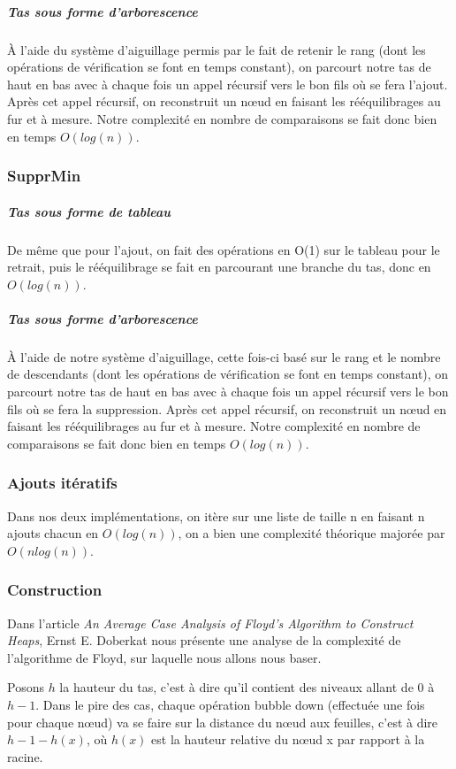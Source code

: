 \documentclass[12pt,a4paper]{article}
\begin{document}
\subparagraph{Tas sous forme d'arborescence}

À l'aide du système d'aiguillage permis par le fait de retenir le rang (dont les opérations de vérification se font en temps constant), on parcourt notre tas de haut en bas avec à chaque fois un appel récursif vers le bon fils où se fera l'ajout. Après cet appel récursif, on reconstruit un nœud en faisant les rééquilibrages au fur et à mesure. Notre complexité en nombre de comparaisons se fait donc bien en temps $O(log (n))$. 


\subsubsection{SupprMin}

\subparagraph{Tas sous forme de tableau}

De même que pour l'ajout, on fait des opérations en O(1) sur le tableau pour le retrait, puis le rééquilibrage se fait en parcourant une branche du tas, donc en $O(log (n))$.
\subparagraph{Tas sous forme d'arborescence}


À l'aide de notre système d'aiguillage, cette fois-ci basé sur le rang et le nombre de descendants (dont les opérations de vérification se font en temps constant), on parcourt notre tas de haut en bas avec à chaque fois un appel récursif vers le bon fils où se fera la suppression. Après cet appel récursif, on reconstruit un nœud en faisant les rééquilibrages au fur et à mesure. Notre complexité en nombre de comparaisons se fait donc bien en temps $O(log (n))$. 



\subsubsection{Ajouts itératifs}

Dans nos deux implémentations, on itère sur une liste de taille n en faisant n ajouts chacun en $O( log (n))$, on a bien une complexité théorique majorée par $O(n log(n))$.
\subsubsection{Construction}

Dans l'article \textit{An Average Case Analysis of Floyd's Algorithm to Construct Heaps}\cite{Doberkat}, Ernst E. Doberkat nous présente une analyse de la complexité de l'algorithme de Floyd, sur laquelle nous allons nous baser.

Posons $h$ la hauteur du tas, c'est à dire qu'il contient des niveaux allant de $0$ à $h - 1$. Dans le pire des cas, chaque opération bubble down (effectuée une fois pour chaque nœud) va se faire sur la distance du nœud aux feuilles, c'est à dire $h - 1 - h(x)$, où $h(x)$ est la hauteur relative du nœud x par rapport à la racine.
\end{document}
